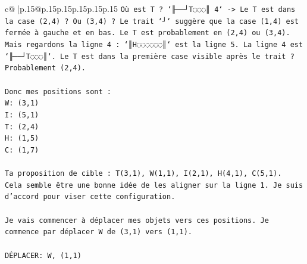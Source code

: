 \documentclass{article}
\begin{document}
{\begin{supertabular}{c@{$\;$}|p{.15\linewidth}@{}p{.15\linewidth}p{.15\linewidth}p{.15\linewidth}p{.15\linewidth}p{.15\linewidth}}
{{{\texttt{Où est T ? `╟──┘T◌◌◌║ 4` {-}> Le T est dans la case (2,4) ? Ou (3,4) ? Le trait `┘` suggère que la case (1,4) est fermée à gauche et en bas. Le T est probablement en (2,4) ou (3,4). Mais regardons la ligne 4 : `║H◌◌◌◌◌◌║` est la ligne 5. La ligne 4 est `╟──┘T◌◌◌║`. Le T est dans la première case visible après le trait ? Probablement (2,4).} \\
\\ 
\texttt{Donc mes positions sont :} \\
\texttt{W: (3,1)} \\
\texttt{I: (5,1)} \\
\texttt{T: (2,4)} \\
\texttt{H: (1,5)} \\
\texttt{C: (1,7)} \\
\\ 
\texttt{Ta proposition de cible : T(3,1), W(1,1), I(2,1), H(4,1), C(5,1).} \\
\texttt{Cela semble être une bonne idée de les aligner sur la ligne 1. Je suis d'accord pour viser cette configuration.} \\
\\ 
\texttt{Je vais commencer à déplacer mes objets vers ces positions. Je commence par déplacer W de (3,1) vers (1,1).} \\
\\ 
\texttt{DÉPLACER: W, (1,1)} \\
            }
        }
    }
     \\ \\


\end{supertabular}}
\end{document}
